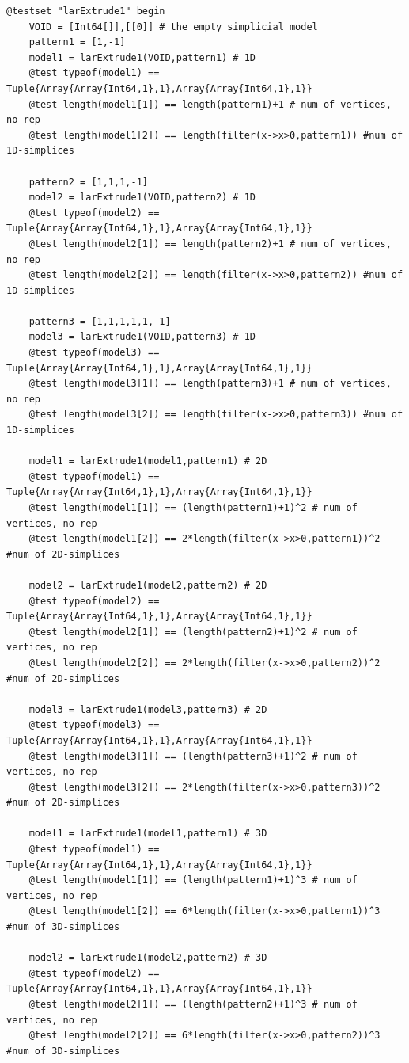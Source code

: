 \documentclass[a4paper,12pt,titlepage]{article}					%
\begin{document}
\begin{Verbatim}
@testset "larExtrude1" begin
	VOID = [Int64[]],[[0]] # the empty simplicial model
	pattern1 = [1,-1]
	model1 = larExtrude1(VOID,pattern1) # 1D
	@test typeof(model1) == Tuple{Array{Array{Int64,1},1},Array{Array{Int64,1},1}}
	@test length(model1[1]) == length(pattern1)+1 # num of vertices, no rep
	@test length(model1[2]) == length(filter(x->x>0,pattern1)) #num of 1D-simplices
	
	pattern2 = [1,1,1,-1]
	model2 = larExtrude1(VOID,pattern2) # 1D
	@test typeof(model2) == Tuple{Array{Array{Int64,1},1},Array{Array{Int64,1},1}}
	@test length(model2[1]) == length(pattern2)+1 # num of vertices, no rep
	@test length(model2[2]) == length(filter(x->x>0,pattern2)) #num of 1D-simplices
	
	pattern3 = [1,1,1,1,1,-1]
	model3 = larExtrude1(VOID,pattern3) # 1D
	@test typeof(model3) == Tuple{Array{Array{Int64,1},1},Array{Array{Int64,1},1}}
	@test length(model3[1]) == length(pattern3)+1 # num of vertices, no rep
	@test length(model3[2]) == length(filter(x->x>0,pattern3)) #num of 1D-simplices
	
	model1 = larExtrude1(model1,pattern1) # 2D
	@test typeof(model1) == Tuple{Array{Array{Int64,1},1},Array{Array{Int64,1},1}}
	@test length(model1[1]) == (length(pattern1)+1)^2 # num of vertices, no rep
	@test length(model1[2]) == 2*length(filter(x->x>0,pattern1))^2 #num of 2D-simplices
	
	model2 = larExtrude1(model2,pattern2) # 2D
	@test typeof(model2) == Tuple{Array{Array{Int64,1},1},Array{Array{Int64,1},1}}
	@test length(model2[1]) == (length(pattern2)+1)^2 # num of vertices, no rep
	@test length(model2[2]) == 2*length(filter(x->x>0,pattern2))^2 #num of 2D-simplices
	
	model3 = larExtrude1(model3,pattern3) # 2D
	@test typeof(model3) == Tuple{Array{Array{Int64,1},1},Array{Array{Int64,1},1}}
	@test length(model3[1]) == (length(pattern3)+1)^2 # num of vertices, no rep
	@test length(model3[2]) == 2*length(filter(x->x>0,pattern3))^2 #num of 2D-simplices
	
	model1 = larExtrude1(model1,pattern1) # 3D
	@test typeof(model1) == Tuple{Array{Array{Int64,1},1},Array{Array{Int64,1},1}}
	@test length(model1[1]) == (length(pattern1)+1)^3 # num of vertices, no rep
	@test length(model1[2]) == 6*length(filter(x->x>0,pattern1))^3 #num of 3D-simplices
	
	model2 = larExtrude1(model2,pattern2) # 3D
	@test typeof(model2) == Tuple{Array{Array{Int64,1},1},Array{Array{Int64,1},1}}
	@test length(model2[1]) == (length(pattern2)+1)^3 # num of vertices, no rep
	@test length(model2[2]) == 6*length(filter(x->x>0,pattern2))^3 #num of 3D-simplices
	

\end{Verbatim}
\end{document}
